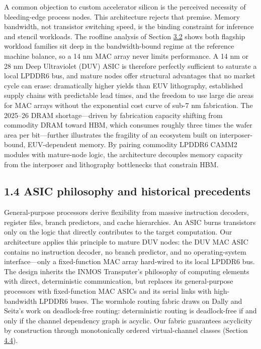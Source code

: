 \documentclass[12pt,onecolumn]{article}
\begin{document}
A common objection to custom accelerator silicon is the perceived necessity of bleeding-edge process nodes. This architecture rejects that premise. Memory bandwidth, not transistor switching speed, is the binding constraint for inference and stencil workloads. The roofline analysis of Section \hyperref[sec:3.2]{3.2} shows both flagship workload families sit deep in the bandwidth-bound regime at the reference machine balance\cite{5}, so a 14 nm MAC array never limits performance. A 14 nm or 28 nm Deep Ultraviolet (DUV) ASIC is therefore perfectly sufficient to saturate a local LPDDR6 bus\cite{17}, and mature nodes offer structural advantages that no market cycle can erase: dramatically higher yields than EUV lithography, established supply chains with predictable lead times, and the freedom to use large die areas for MAC arrays without the exponential cost curve of sub-7 nm fabrication. The 2025--26 DRAM shortage---driven by fabrication capacity shifting from commodity DRAM toward HBM, which consumes roughly three times the wafer area per bit\cite{25}---further illustrates the fragility of an ecosystem built on interposer-bound, EUV-dependent memory. By pairing commodity LPDDR6 CAMM2 modules with mature-node logic, the architecture decouples memory capacity from the interposer and lithography bottlenecks that constrain HBM.

\subsection*{1.4 ASIC philosophy and historical precedents}\label{sec:1.4}

General-purpose processors derive flexibility from massive instruction decoders, register files, branch predictors, and cache hierarchies. An ASIC burns transistors only on the logic that directly contributes to the target computation\cite{10}. Our architecture applies this principle to mature DUV nodes: the DUV MAC ASIC contains no instruction decoder, no branch predictor, and no operating-system interface---only a fixed-function MAC array hard-wired to its local LPDDR6 bus. The design inherits the INMOS Transputer's philosophy of computing elements with direct, deterministic communication\cite{12}, but replaces its general-purpose processors with fixed-function MAC ASICs and its serial links with high-bandwidth LPDDR6 buses. The wormhole routing fabric draws on Dally and Seitz's work on deadlock-free routing: deterministic routing is deadlock-free if and only if the channel dependency graph is acyclic\cite{13,14}. Our fabric guarantees acyclicity by construction through monotonically ordered virtual-channel classes (Section \hyperref[sec:4.4]{4.4}).
\end{document}
